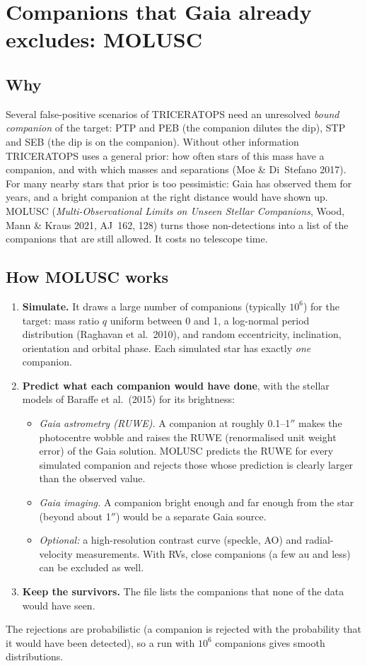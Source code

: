 \section{Companions that Gaia already excludes: MOLUSC}
\label{sec:molusc}

\subsection*{Why}
Several false-positive scenarios of TRICERATOPS need an unresolved
\emph{bound companion} of the target: PTP and PEB (the companion dilutes
the dip), STP and SEB (the dip is on the companion). Without other
information TRICERATOPS uses a general prior: how often stars of this mass
have a companion, and with which masses and separations (Moe \& Di~Stefano
2017). For many nearby stars that prior is too pessimistic: Gaia has
observed them for years, and a bright companion at the right distance would
have shown up. MOLUSC (\emph{Multi-Observational Limits on Unseen Stellar
Companions}, Wood, Mann \& Kraus 2021, AJ~162, 128) turns those
non-detections into a list of the companions that are still allowed. It
costs no telescope time.

\subsection*{How MOLUSC works}
\begin{enumerate}
\item \textbf{Simulate.} It draws a large number of companions (typically
$10^6$) for the target: mass ratio $q$ uniform between 0 and 1, a log-normal
period distribution (Raghavan et al.\ 2010), and random eccentricity,
inclination, orientation and orbital phase. Each simulated star has
exactly \emph{one} companion.
\item \textbf{Predict what each companion would have done}, with the
stellar models of Baraffe et al.\ (2015) for its brightness:
\begin{itemize}
\item \emph{Gaia astrometry (RUWE).} A companion at roughly 0.1--1$''$
makes the photocentre wobble and raises the RUWE (renormalised unit weight
error) of the Gaia solution. MOLUSC predicts the RUWE for every simulated
companion and rejects those whose prediction is clearly larger than the
observed value.
\item \emph{Gaia imaging.} A companion bright enough and far enough from the
star (beyond about 1$''$) would be a separate Gaia source.
\item \emph{Optional:} a high-resolution contrast curve (speckle, AO) and
radial-velocity measurements. With RVs, close companions (a few au and
less) can be excluded as well.
\end{itemize}
\item \textbf{Keep the survivors.} The file  lists
the companions that none of the data would have seen.
\end{enumerate}
The rejections are probabilistic (a companion is rejected with the
probability that it would have been detected), so a run with $10^6$
companions gives smooth distributions.

